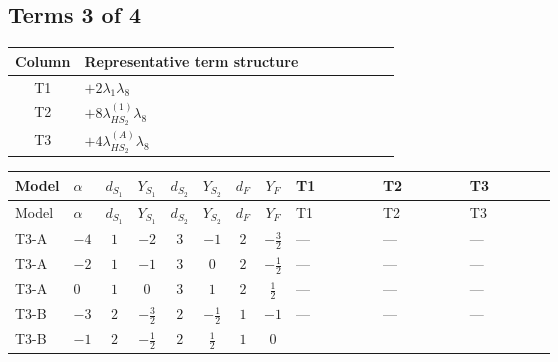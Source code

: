 \documentclass[8pt]{article}
\begin{document}
\begin{landscape}
\subsection*{Terms 3 of 4}
\begin{center}
\begin{tabular}{@{}c >{\raggedright\arraybackslash}p{0.82\linewidth}@{}}
\toprule
Column & Representative term structure \\
\midrule
T1 & \(\displaystyle +2 {\lambda_1} {\lambda_{8}}\) \\
\midrule
T2 & \(\displaystyle +8 {\lambda_{HS_2}^{(1)}} {\lambda_{8}}\) \\
\midrule
T3 & \(\displaystyle +4 {\lambda_{HS_2}^{(A)}} {\lambda_{8}}\) \\
\midrule
\bottomrule
\end{tabular}
\end{center}
\smallskip
\tiny
\begin{longtable}{@{}llcccccc >{\raggedright\arraybackslash}p{0.21\linewidth} >{\raggedright\arraybackslash}p{0.21\linewidth} >{\raggedright\arraybackslash}p{0.21\linewidth}@{}}
\toprule
Model & $\alpha$ & $d_{S_1}$ & $Y_{S_1}$ & $d_{S_2}$ & $Y_{S_2}$ & $d_F$ & $Y_F$ & T1 & T2 & T3 \\
\midrule
\endfirsthead
\toprule
Model & $\alpha$ & $d_{S_1}$ & $Y_{S_1}$ & $d_{S_2}$ & $Y_{S_2}$ & $d_F$ & $Y_F$ & T1 & T2 & T3 \\
\midrule
\endhead
T3-A & $-4$ & $1$ & $-2$ & $3$ & $-1$ & $2$ & $-\frac{3}{2}$ & --- & --- & --- \\
\midrule
T3-A & $-2$ & $1$ & $-1$ & $3$ & $0$ & $2$ & $-\frac{1}{2}$ & --- & --- & --- \\
\midrule
T3-A & $0$ & $1$ & $0$ & $3$ & $1$ & $2$ & $\frac{1}{2}$ & --- & --- & --- \\
\midrule
T3-B & $-3$ & $2$ & $-\frac{3}{2}$ & $2$ & $-\frac{1}{2}$ & $1$ & $-1$ & --- & --- & --- \\
\midrule
T3-B & $-1$ & $2$ & $-\frac{1}{2}$ & $2$ & $\frac{1}{2}$ & $1$ & $0$ & \scriptsize\adjustbox{max width=\linewidth}{$\begin{gathered} +2 {\lambda_1} {\lambda_{8}}\end{gathered}$} & \scriptsize\adjustbox{max width=\linewidth}{$\begin{gathered} +8 {\lambda_{HS_2}^{(1)}} {\lambda_{8}}\end{gathered}$} & \scriptsize\adjustbox{max width=\linewidth}{$\begin{gathered} +4 {\lambda_{HS_2}^{(A)}} {\lambda_{8}}\end{gathered}$} \\

\end{longtable}
\end{landscape}
\end{document}
